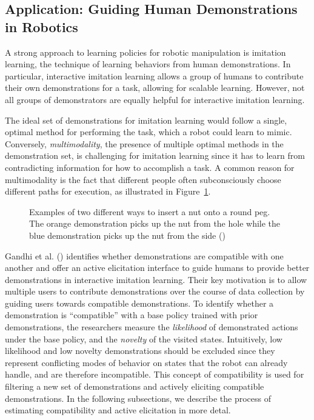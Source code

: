 \documentclass[
  letterpaper,
  numbers=noenddot,
  DIV=11]{scrreprt}
\theoremstyle{plain}
\theoremstyle{definition}
\theoremstyle{remark}
\begin{document}
\subsection{Application: Guiding Human Demonstrations in
Robotics}\label{application-guiding-human-demonstrations-in-robotics}

A strong approach to learning policies for robotic manipulation is
imitation learning, the technique of learning behaviors from human
demonstrations. In particular, interactive imitation learning allows a
group of humans to contribute their own demonstrations for a task,
allowing for scalable learning. However, not all groups of demonstrators
are equally helpful for interactive imitation learning.

The ideal set of demonstrations for imitation learning would follow a
single, optimal method for performing the task, which a robot could
learn to mimic. Conversely, \emph{multimodality}, the presence of
multiple optimal methods in the demonstration set, is challenging for
imitation learning since it has to learn from contradicting information
for how to accomplish a task. A common reason for multimodality is the
fact that different people often subconsciously choose different paths
for execution, as illustrated in Figure~\ref{fig-multimodalexecution}.

\begin{figure}


\caption{\label{fig-multimodalexecution}Examples of two different ways
to insert a nut onto a round peg. The orange demonstration picks up the
nut from the hole while the blue demonstration picks up the nut from the
side ()}

\end{figure}%

Gandhi et al. ()
identifies whether demonstrations are compatible with one another and
offer an active elicitation interface to guide humans to provide better
demonstrations in interactive imitation learning. Their key motivation
is to allow multiple users to contribute demonstrations over the course
of data collection by guiding users towards compatible demonstrations.
To identify whether a demonstration is ``compatible'' with a base policy
trained with prior demonstrations, the researchers measure the
\emph{likelihood} of demonstrated actions under the base policy, and the
\emph{novelty} of the visited states. Intuitively, low likelihood and
low novelty demonstrations should be excluded since they represent
conflicting modes of behavior on states that the robot can already
handle, and are therefore incompatible. This concept of compatibility is
used for filtering a new set of demonstrations and actively eliciting
compatible demonstrations. In the following subsections, we describe the
process of estimating compatibility and active elicitation in more
detal.
\end{document}
